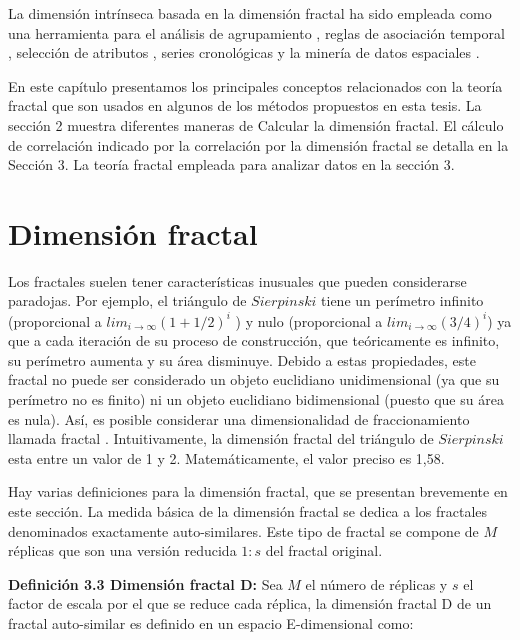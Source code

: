 La dimensión intrínseca basada en la dimensión fractal ha sido empleada como una herramienta para el análisis de agrupamiento \cite{Barbara2003},  reglas de asociación temporal \cite{Barbara2004}, selección de atributos \cite{journals/jidm/TrainaTF10}, series cronológicas \cite{Chakrabarti:2002:FLA:584792.584797} y la minería de datos espaciales \cite{Traina:2001:TST:502512.502538}.

En este capítulo presentamos los principales conceptos relacionados con la teoría fractal que son usados en algunos de los métodos propuestos en esta tesis. La sección 2 muestra diferentes maneras de Calcular la dimensión fractal. El cálculo de correlación indicado por la correlación por la dimensión fractal se detalla en la Sección 3. La teoría fractal empleada para analizar   datos en la sección 3.

\section{Dimensión fractal}

Los fractales suelen tener características inusuales que pueden considerarse paradojas. Por ejemplo, el triángulo de $Sierpinski$ tiene un perímetro infinito (proporcional a $lim_{i\rightarrow\infty} (1+1/2)^i  $ ) y nulo (proporcional a $lim_{i\rightarrow\infty} (3/4)^i $) ya que a cada iteración de su proceso de construcción, que  teóricamente  es infinito, su perímetro aumenta y su área disminuye. Debido a estas propiedades, este fractal no puede ser considerado un objeto euclidiano unidimensional  (ya que su perímetro no es finito) ni un objeto euclidiano bidimensional (puesto que su área es nula). Así, es posible considerar una dimensionalidad de fraccionamiento llamada fractal \cite{di2016fractal}. Intuitivamente, la dimensión fractal del triángulo de $Sierpinski$ esta entre un valor de 1 y 2. Matemáticamente, el valor preciso es 1,58.

Hay varias definiciones para la dimensión fractal, que se presentan brevemente en este sección. La medida básica de la dimensión fractal se dedica a los fractales denominados exactamente auto-similares. Este tipo de fractal se compone de $M$ réplicas que son   una  versión reducida $1:s$ del fractal original.

\textbf{Definición 3.3 Dimensión fractal D:} Sea $M$ el número de réplicas y $s$ el factor de  escala
 por el que se reduce cada réplica, la dimensión fractal D de un fractal auto-similar es   definido en un espacio E-dimensional como:

